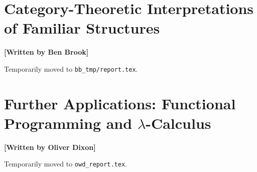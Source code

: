 \documentclass[10pt,a4paper,reqno]{amsart}
\numberwithin{figure}{section}
\begin{document}
\section{Category-Theoretic %
        Interpretations of Familiar Structures}
\begin{flushright}
        \textbf{[Written by Ben Brook]}
\end{flushright}

\noindent Temporarily moved to \texttt{bb\_tmp/report.tex}.

\section{Further Applications: %
        Functional Programming and \texorpdfstring{$\lambda$}{Lambda}-Calculus}
\begin{flushright}
        \textbf{[Written by Oliver Dixon]}
\end{flushright}

\noindent Temporarily moved to \texttt{owd\_report.tex}.
\printbibliography[title=Cited Works]
\end{document}
